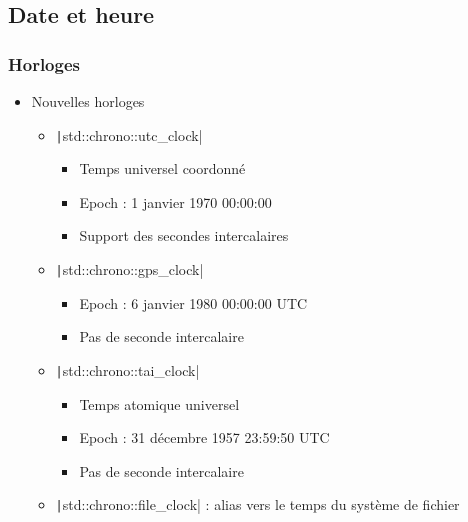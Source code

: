 \documentclass[C++.tex]{subfiles}
\begin{document}
\subsection*{Date et heure}
\begin{frame}[fragile]
	\frametitle{Horloges}
	\begin{itemize}
		\item Nouvelles horloges
		\begin{itemize}
			\shorthandoff{:}
			\item \texttt|std::chrono::utc_clock|
			\begin{itemize}
				\item Temps universel coordonné
				\item Epoch : 1 janvier 1970 00:00:00
				\item Support des secondes intercalaires
			\end{itemize}
			\item \texttt|std::chrono::gps_clock|
			\begin{itemize}
				\item Epoch : 6 janvier 1980 00:00:00 UTC
				\item Pas de seconde intercalaire
			\end{itemize}
			\item \texttt|std::chrono::tai_clock|
			\begin{itemize}
				\item Temps atomique universel
				\item Epoch : 31 décembre 1957 23:59:50 UTC
				\item Pas de seconde intercalaire
			\end{itemize}
			\item \texttt|std::chrono::file_clock| : alias vers le temps du système de fichier
			\shorthandon{:}
		\end{itemize}
	\end{itemize}


\end{frame}
\end{document}
